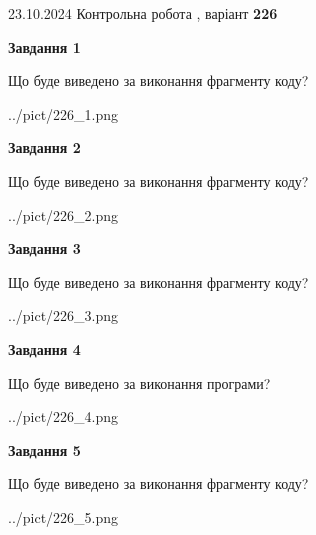 \documentclass[12pt, ukrainian]{article}
\begin{document}
{\Large{23.10.2024 Контрольна робота , варіант  \No \textbf { 226 }\par}}
{
\begin {large}
{\begin {center}\textbf{Завдання 1}\end {center}}

Що буде виведено за виконання фрагменту коду?\par
\begin{center}
	{../pict/226_1.png}
\end{center}
\newpage

{\begin {center}\textbf{Завдання 2}\end {center}}

Що буде виведено за виконання фрагменту коду?\par
\begin{center}
	{../pict/226_2.png}
\end{center}
\newpage

{\begin {center}\textbf{Завдання 3}\end {center}}

Що буде виведено за виконання фрагменту коду?\par
\begin{center}
	{../pict/226_3.png}
\end{center}
\newpage

{\begin {center}\textbf{Завдання 4}\end {center}}

Що буде виведено за виконання програми?\par
\begin{center}
	{../pict/226_4.png}
\end{center}
\newpage

{\begin {center}\textbf{Завдання 5}\end {center}}

Що буде виведено за виконання фрагменту коду?\par
\begin{center}
	{../pict/226_5.png}
\end{center}
\newpage


\end{large}}
\end{document}
